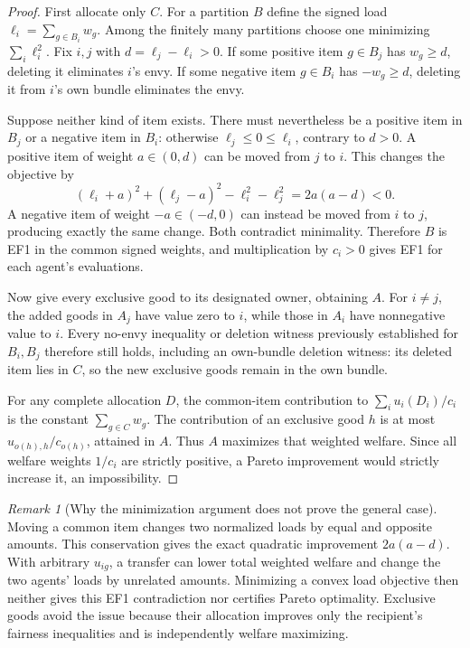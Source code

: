 \documentclass[11pt]{article}
\theoremstyle{definition}
\theoremstyle{remark}
\newtheorem{remark}{Remark}
\begin{document}
\begin{proof}
First allocate only $C$. For a partition $B$ define the signed load $\ell_i=\sum_{g\in B_i}w_g$. Among the finitely many partitions choose one minimizing $\sum_i\ell_i^2$. Fix $i,j$ with $d=\ell_j-\ell_i>0$. If some positive item $g\in B_j$ has $w_g\geq d$, deleting it eliminates $i$'s envy. If some negative item $g\in B_i$ has $-w_g\geq d$, deleting it from $i$'s own bundle eliminates the envy.

Suppose neither kind of item exists. There must nevertheless be a positive item in $B_j$ or a negative item in $B_i$: otherwise $\ell_j\leq0\leq\ell_i$, contrary to $d>0$. A positive item of weight $a\in(0,d)$ can be moved from $j$ to $i$. This changes the objective by
\[
 (\ell_i+a)^2+(\ell_j-a)^2-\ell_i^2-\ell_j^2=2a(a-d)<0.
\]
A negative item of weight $-a\in(-d,0)$ can instead be moved from $i$ to $j$, producing exactly the same change. Both contradict minimality. Therefore $B$ is EF1 in the common signed weights, and multiplication by $c_i>0$ gives EF1 for each agent's evaluations.

Now give every exclusive good to its designated owner, obtaining $A$. For $i\neq j$, the added goods in $A_j$ have value zero to $i$, while those in $A_i$ have nonnegative value to $i$. Every no-envy inequality or deletion witness previously established for $B_i,B_j$ therefore still holds, including an own-bundle deletion witness: its deleted item lies in $C$, so the new exclusive goods remain in the own bundle.

For any complete allocation $D$, the common-item contribution to $\sum_i u_i(D_i)/c_i$ is the constant $\sum_{g\in C}w_g$. The contribution of an exclusive good $h$ is at most $u_{o(h),h}/c_{o(h)}$, attained in $A$. Thus $A$ maximizes that weighted welfare. Since all welfare weights $1/c_i$ are strictly positive, a Pareto improvement would strictly increase it, an impossibility.
\end{proof}

\begin{remark}[Why the minimization argument does not prove the general case]
Moving a common item changes two normalized loads by equal and opposite amounts. This conservation gives the exact quadratic improvement $2a(a-d)$. With arbitrary $u_{ig}$, a transfer can lower total weighted welfare and change the two agents' loads by unrelated amounts. Minimizing a convex load objective then neither gives this EF1 contradiction nor certifies Pareto optimality. Exclusive goods avoid the issue because their allocation improves only the recipient's fairness inequalities and is independently welfare maximizing.
\end{remark}
\end{document}

